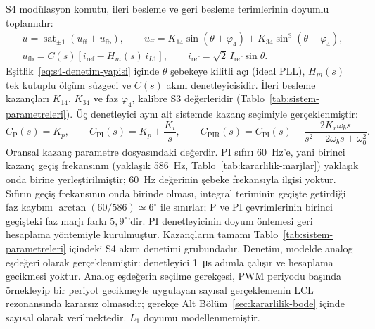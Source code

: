 S4 modülasyon komutu, ileri besleme ve geri besleme terimlerinin doyumlu toplamıdır:
\begin{equation}
  \begin{gathered}
    u=\operatorname{sat}_{\pm1}\!\left(u_{\mathrm{ff}}+u_{\mathrm{fb}}\right),\qquad
    u_{\mathrm{ff}}=K_{14}\sin(\theta+\varphi_4)+K_{34}\sin^3(\theta+\varphi_4),\\
    u_{\mathrm{fb}}=C(s)\left[i_{\mathrm{ref}}-H_m(s)\,i_{L1}\right],\qquad
    i_{\mathrm{ref}}=\sqrt2\,I_{\mathrm{ref}}\sin\theta .
  \end{gathered}
  \label{eq:s4-denetim-yapisi}
\end{equation}
Eşitlik~\eqref{eq:s4-denetim-yapisi} içinde $\theta$ şebekeye kilitli açı (ideal PLL), $H_m(s)$ tek kutuplu ölçüm süzgeci ve $C(s)$ akım denetleyicisidir. İleri besleme kazançları $K_{14}$, $K_{34}$ ve faz $\varphi_4$, kalibre S3 değerleridir (Tablo~\ref{tab:sistem-parametreleri}). Üç denetleyici aynı alt sistemde kazanç seçimiyle gerçeklenmiştir:
\begin{equation}
  C_{\mathrm{P}}(s)=K_p,\qquad
  C_{\mathrm{PI}}(s)=K_p+\frac{K_i}{s},\qquad
  C_{\mathrm{PIR}}(s)=C_{\mathrm{PI}}(s)+\frac{2K_r\omega_b s}{s^2+2\omega_b s+\omega_0^2}.
  \label{eq:s4-denetleyiciler}
\end{equation}
Oransal kazanç parametre dosyasındaki değerdir. PI sıfırı \SI{60}{\hertz}'e, yani birinci kazanç geçiş frekansının (yaklaşık \SI{586}{\hertz}, Tablo~\ref{tab:kararlilik-marjlar}) yaklaşık onda birine yerleştirilmiştir; \SI{60}{\hertz} değerinin şebeke frekansıyla ilgisi yoktur. Sıfırın geçiş frekansının onda birinde olması, integral teriminin geçişte getirdiği faz kaybını $\arctan(60/586)\simeq6^{\circ}$ ile sınırlar; P ve PI çevrimlerinin birinci geçişteki faz marjı farkı $5{,}9^{\circ}$'dir. PI denetleyicinin doyum önlemesi geri hesaplama yöntemiyle kurulmuştur. Kazançların tamamı Tablo~\ref{tab:sistem-parametreleri} içindeki S4 akım denetimi grubundadır. Denetim, modelde analog eşdeğeri olarak gerçeklenmiştir: denetleyici \SI{1}{\micro\second} adımla çalışır ve hesaplama gecikmesi yoktur. Analog eşdeğerin seçilme gerekçesi, PWM periyodu başında örnekleyip bir periyot gecikmeyle uygulayan sayısal gerçeklemenin LCL rezonansında kararsız olmasıdır; gerekçe Alt Bölüm~\ref{sec:kararlilik-bode} içinde sayısal olarak verilmektedir. $L_1$ doyumu modellenmemiştir.

